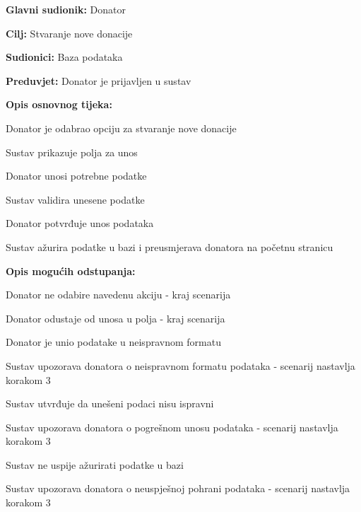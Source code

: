 					\noindent {}
					\begin{packed_item}
	
						\item \textbf{Glavni sudionik: }Donator
						\item  \textbf{Cilj:} Stvaranje nove donacije
						\item  \textbf{Sudionici:} Baza podataka
						\item  \textbf{Preduvjet:} Donator je prijavljen u sustav
						\item  \textbf{Opis osnovnog tijeka:}
						
						\item[] \begin{packed_enum}
							\item Donator je odabrao opciju za stvaranje nove donacije
							\item Sustav prikazuje polja za unos
							\item Donator unosi potrebne podatke
							\item Sustav validira unesene podatke
							\item Donator potvrđuje unos podataka
							\item Sustav ažurira podatke u bazi i preusmjerava donatora na početnu stranicu
						\end{packed_enum}

						\item  \textbf{Opis mogućih odstupanja:}

						\item[] \begin{packed_item}
							\item[1.a] Donator ne odabire navedenu akciju - kraj scenarija
							\item[3.a] Donator odustaje od unosa u polja - kraj scenarija
							\item[4.a] Donator je unio podatake u neispravnom formatu
							\item[] \begin{packed_enum}
								\item Sustav upozorava donatora o neispravnom formatu podataka - scenarij nastavlja korakom 3
							\end{packed_enum}	
							\item[6.a] Sustav utvrđuje da unešeni podaci nisu ispravni
							\item[] \begin{packed_enum}
								\item Sustav upozorava donatora o pogrešnom unosu podataka - scenarij nastavlja korakom 3
							\end{packed_enum}	
							\item[6.b] Sustav ne uspije ažurirati podatke u bazi
							\item[] \begin{packed_enum}
								\item Sustav upozorava donatora o neuspješnoj pohrani podataka - scenarij nastavlja korakom 3
							\end{packed_enum}				
						\end{packed_item}
					\end{packed_item}				

